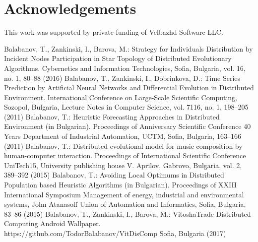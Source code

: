 \documentclass{llncs}
\begin{document}
\section*{Acknowledgements}
%
This work was supported by private funding of Velbazhd Software LLC.
%
%
\begin{thebibliography}{}
%
Balabanov, T., Zankinski, I., Barova, M.:
Strategy for Individuals Distribution by Incident Nodes Participation in Star Topology of Distributed Evolutionary Algorithms.
Cybernetics and Information Technologies, Sofia, Bulgaria, vol. 16, no. 1, 80--88  (2016)
%
Balabanov, T., Zankinski, I., Dobrinkova, D.:
Time Series Prediction by Artificial Neural Networks and Differential Evolution in Distributed Environment.
International Conference on Large-Scale Scientific Computing, Sozopol, Bulgaria, Lecture Notes in Computer Science, vol. 7116, no. 1, 198--205  (2011)
%
Balabanov, T.:
Heuristic Forecasting Approaches in Distributed Environment (in Bulgarian).
Proceedings of Anniversary Scientific Conference 40 Years Department of Industrial Automation, UCTM, Sofia, Bulgaria, 163--166 (2011)
%
Balabanov, T.:
Distributed evolutional model for music composition by human-computer interaction.
Proceedings of International Scientific Conference UniTech15, University publishing house V. Aprilov, Gabrovo, Bulgaria, vol. 2, 389--392 (2015)
%
Balabanov, T.:
Avoiding Local Optimums in Distributed Population based Heuristic Algorithms (in Bulgarian).
Proceedings of XXIII International Symposium Management of energy, industrial and environmental systems, John Atanasoff Union of Automation and Informatics, Sofia, Bulgaria, 83--86 (2015)
%
Balabanov, T., Zankinski, I., Barova, M.:
VitoshaTrade Distributed Computing Android Wallpaper.
https://github.com/TodorBalabanov/VitDisComp Sofia, Bulgaria  (2017)
%
\end{thebibliography}
\end{document}

